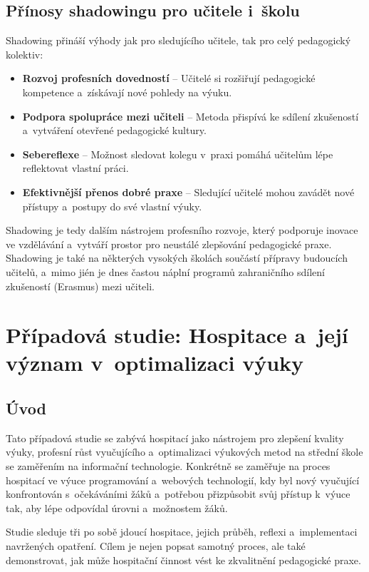 \subsection{Přínosy shadowingu pro učitele i~školu}
Shadowing přináší výhody jak pro sledujícího učitele, tak pro celý pedagogický kolektiv:
\begin{itemize}
    \item \textbf{Rozvoj profesních dovedností} – Učitelé si rozšiřují pedagogické kompetence a~získávají nové pohledy na výuku.
    \item \textbf{Podpora spolupráce mezi učiteli} – Metoda přispívá ke sdílení zkušeností a~vytváření otevřené pedagogické kultury.
    \item \textbf{Sebereflexe} – Možnost sledovat kolegu v~praxi pomáhá učitelům lépe reflektovat vlastní práci.
    \item \textbf{Efektivnější přenos dobré praxe} – Sledující učitelé mohou zavádět nové přístupy a~postupy do své vlastní výuky.
\end{itemize}

Shadowing je tedy dalším nástrojem profesního rozvoje, který podporuje inovace ve vzdělávání a~vytváří prostor pro neustálé zlepšování pedagogické praxe. Shadowing je také na některých vysokých školách součástí přípravy budoucích učitelů, a~mimo jién je dnes častou náplní programů zahraničního sdílení zkušeností (Erasmus) mezi učiteli.


\section{Případová studie: Hospitace a~její význam v~optimalizaci výuky}

\subsection*{Úvod}

Tato případová studie se zabývá hospitací jako nástrojem pro zlepšení kvality výuky, profesní růst vyučujícího a~optimalizaci výukových metod na střední škole se zaměřením na informační technologie. Konkrétně se zaměřuje na proces hospitací ve výuce programování a~webových technologií, kdy byl nový vyučující konfrontován s~očekáváními žáků a~potřebou přizpůsobit svůj přístup k~výuce tak, aby lépe odpovídal úrovni a~možnostem žáků.

Studie sleduje tři po sobě jdoucí hospitace, jejich průběh, reflexi a~implementaci navržených opatření. Cílem je nejen popsat samotný proces, ale také demonstrovat, jak může hospitační činnost vést ke zkvalitnění pedagogické praxe.

